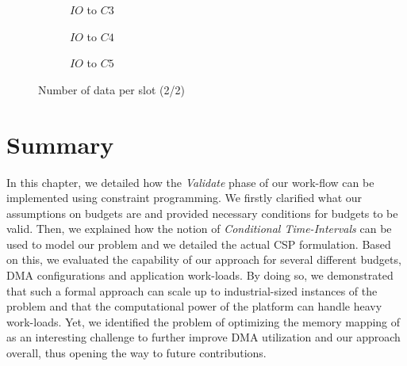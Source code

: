 \documentclass[main.tex]{subfiles}
\begin{document}
\begin{figure}
    \begin{subfigure}[b]{0.3\textwidth}  \caption{\PC{} $IO$ to $C3$} \end{subfigure} 
    \begin{subfigure}[b]{0.3\textwidth}  \caption{\PC{} $IO$ to $C4$} \end{subfigure} 
    \begin{subfigure}[b]{0.3\textwidth}  \caption{\PC{} $IO$ to $C5$} \end{subfigure}

    \caption{Number of data per \PC{} slot (2/2)}
    \label{fig_validation_expePcUtilsNbbufs2}
\end{figure}


\clearpage
\section{Summary}
In this chapter, we detailed how the \emph{Validate} phase of our work-flow can be implemented using constraint programming. We firstly clarified what our assumptions on budgets are and provided necessary conditions for budgets to be valid. Then, we explained how the notion of \emph{Conditional Time-Intervals} can be used to model our problem and we detailed the actual CSP formulation. Based on this, we evaluated the capability of our approach for several different budgets, DMA configurations and application work-loads. By doing so, we demonstrated that such a formal approach can scale up to industrial-sized instances of the problem and that the computational power of the platform can handle heavy work-loads. Yet, we identified the problem of optimizing the memory mapping of as an interesting challenge to further improve DMA utilization and our approach overall, thus opening the way to future contributions.

\clearpage
\subbiblio
\end{document}
